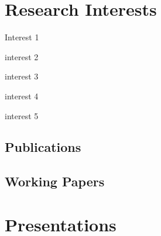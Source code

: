 \documentclass[11pt]{article}
\begin{document}


\section*{Research Interests}

\hspace{-.25em}\begin{itemize*}[itemjoin={{; }}, label={}]
\item Interest 1
\item interest 2
\item interest 3
\item interest 4
\item interest 5
\end{itemize*}


\begin{refsection}
\section*{Publications}
\nocite{*}
\printbibliography[heading = none, keyword = article, env = mybib]
\end{refsection}


\begin{refsection}
\section*{Working Papers}
\nocite{*}
\printbibliography[heading = none, keyword = working, env = mybib]
\end{refsection}


\section*{Presentations}
\end{document}
